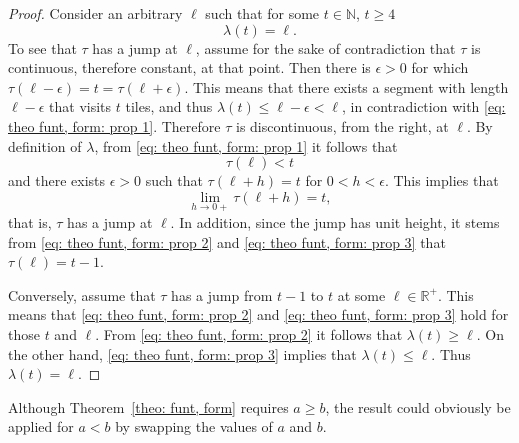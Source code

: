 \documentclass[12pt, a4paper]{article}
\newcommand{\funt}{\tau} %
\newcommand{\funl}{\lambda} %
\newcommand{\len}{\ell} %
\newcommand{\tiles}{t} %
\begin{document}
\begin{proof}
Consider an arbitrary $\len$ such that for some $\tiles \in \mathbb N$, $\tiles \geq 4$
\begin{equation}
\label{eq: theo funt, form: prop 1}
\funl(\tiles)=\len.
\end{equation}
To see that $\funt$ has a jump at $\len$, assume for the sake of contradiction that $\funt$ is continuous, therefore constant, at that point. Then there is $\epsilon > 0$ for which $\funt(\len-\epsilon) = \tiles = \funt(\len+\epsilon)$. This means that there exists a segment with length $\len-\epsilon$ that visits $\tiles$ tiles, and thus $\funl(\tiles) \leq \len-\epsilon < \len$, in contradiction with \eqref{eq: theo funt, form: prop 1}. Therefore $\funt$ is discontinuous, from the right, at $\len$. By definition of $\funl$, from \eqref{eq: theo funt, form: prop 1} it follows that
\begin{equation}
\label{eq: theo funt, form: prop 2}
\funt(\len) < \tiles
\end{equation}
and there exists $\epsilon > 0$ such that $\funt(\len+h) = \tiles$ for $0 < h < \epsilon$. This implies that
\begin{equation}
\label{eq: theo funt, form: prop 3}
\lim_{h \rightarrow 0+} \funt(\len+h) = \tiles,
\end{equation}
that is, $\funt$ has a jump at $\len$. In addition, since the jump has unit height, it stems from \eqref{eq: theo funt, form: prop 2} and \eqref{eq: theo funt, form: prop 3}  that $\funt(\len) = \tiles-1$.

Conversely, assume that $\funt$ has a jump from $\tiles-1$ to $\tiles$ at some $\len \in \mathbb R^+$. This means that \eqref{eq: theo funt, form: prop 2} and \eqref{eq: theo funt, form: prop 3} hold for those $\tiles$ and $\len$. From \eqref{eq: theo funt, form: prop 2} it follows that  $\funl(\tiles) \geq \len$. On the other hand, \eqref{eq: theo funt, form: prop 3} implies that $\funl(\tiles) \leq \len$. Thus $\funl(\tiles)=\len$.
\end{proof}

Although Theorem~\ref{theo: funt, form} requires $a \geq b$, the result could obviously be applied for $a < b$ by swapping the values of $a$ and $b$.
\end{document}
